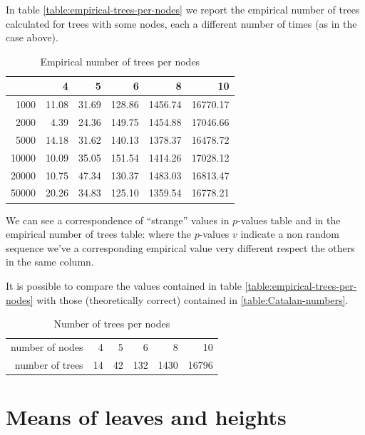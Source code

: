 In table \autoref{table:empirical-trees-per-nodes} we report the
empirical number of trees calculated for trees with some nodes, each a
different number of times (as in the case above).
\begin{table}[ht]
  \begin{center}
    \begin{tabular}{rrrrrr}
      \hline
      & 4 & 5 & 6 & 8 & 10 \\ 
      \hline
      1000 & 11.08 & 31.69 & 128.86 & 1456.74 & 16770.17 \\ 
      2000 & 4.39 & 24.36 & 149.75 & 1454.88 & 17046.66 \\ 
      5000 & 14.18 & 31.62 & 140.13 & 1378.37 & 16478.72 \\ 
      10000 & 10.09 & 35.05 & 151.54 & 1414.26 & 17028.12 \\ 
      20000 & 10.75 & 47.34 & 130.37 & 1483.03 & 16813.47 \\ 
      50000 & 20.26 & 34.83 & 125.10 & 1359.54 & 16778.21 \\ 
      \hline
    \end{tabular}
    \caption{Empirical number of trees per nodes}
    \label{table:empirical-trees-per-nodes}
  \end{center}
\end{table}
We can see a correspondence of ``strange'' values in $p$-values table
and in the empirical number of trees table: where the $p$-values $v$
indicate a non random sequence we've a corresponding empirical value
very different respect the others in the same column.

It is possible to compare the values contained in table
\autoref{table:empirical-trees-per-nodes} with those (theoretically
correct) contained in \autoref{table:Catalan-numbers}.
\begin{table}[ht]
  \begin{center}
    \begin{tabular}{rrrrrr}
      \hline
      number of nodes & 4 & 5 & 6 & 8 & 10 \\ 
      number of trees & 14 & 42 & 132 & 1430 & 16796 \\ 
      \hline
    \end{tabular}
    \caption{Number of trees per nodes}
    \label{table:catalan-numbers}
  \end{center}
\end{table}

\section{Means of leaves and heights}


